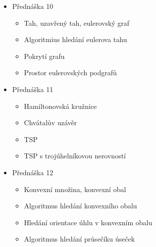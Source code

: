 \begin{itemize}
    \item Přednáška 10
    \begin{itemize}
        \item Tah, uzavřený tah, eulerovský graf
        \item Algoritmius hledání eulerova tahu
        \item Pokrytí grafu
        \item Prostor eulerovských podgrafů
    \end{itemize}

    \item Přednáška 11
    \begin{itemize}
        \item Hamiltonovská kružnice
        \item Chvátalův uzávěr
        \item TSP
        \item TSP s trojúhelníkovou nerovností
    \end{itemize}

    \item Přednáška 12
    \begin{itemize}
        \item Konvexní množina, konvexní obal
        \item Algoritmus hledání konvexního obalu
        \item Hledání orientace úhlu v konvexním obalu
        \item Algoritmus hledání průsečíku úseček
    \end{itemize}
\end{itemize}
